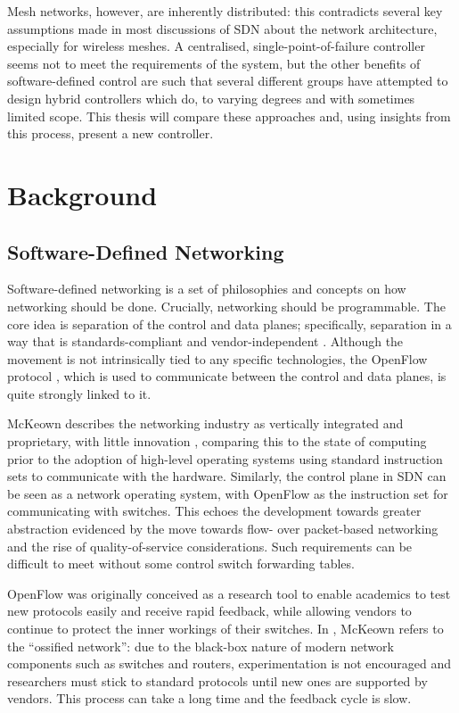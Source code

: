 \documentclass[pdftex,12pt,a4paper]{article}
\begin{document}
Mesh networks, however, are inherently distributed: this contradicts several key assumptions made in most discussions of SDN about the network architecture, especially for wireless meshes. A centralised, single-point-of-failure controller seems not to meet the requirements of the system, but the other benefits of software-defined control are such that several different groups have attempted to design hybrid controllers which do, to varying degrees and with sometimes limited scope. This thesis will compare these approaches and, using insights from this process, present a new controller.

\newpage
\section{Background}
\subsection{Software-Defined Networking}
Software-defined networking is a set of philosophies and concepts on how networking should be done. Crucially, networking should be programmable. The core idea is separation of the control and data planes; specifically, separation in a way that is standards-compliant and vendor-independent \cite{onf:sdn}. Although the movement is not intrinsically tied to any specific technologies, the OpenFlow protocol \cite{onf:switch140}, which is used to communicate between the control and data planes, is quite strongly linked to it.

McKeown describes the networking industry as vertically integrated and proprietary, with little innovation \cite{mckeown:sdn}, comparing this to the state of computing prior to the adoption of high-level operating systems using standard instruction sets to communicate with the hardware. Similarly, the control plane in SDN can be seen as a network operating system, with OpenFlow as the instruction set for communicating with switches. This echoes the development towards greater abstraction evidenced by the move towards flow- over packet-based networking and the rise of quality-of-service considerations. Such requirements can be difficult to meet without some control switch forwarding tables.

OpenFlow was originally conceived as a research tool to enable academics to test new protocols easily and receive rapid feedback, while allowing vendors to continue to protect the inner workings of their switches. In \cite{mckeown:openflow}, McKeown refers to the  ``ossified network'': due to the black-box nature of modern network components such as switches and routers, experimentation is not encouraged and researchers must stick to standard protocols until new ones are supported by vendors. This process can take a long time and the feedback cycle is slow. 
\end{document}
